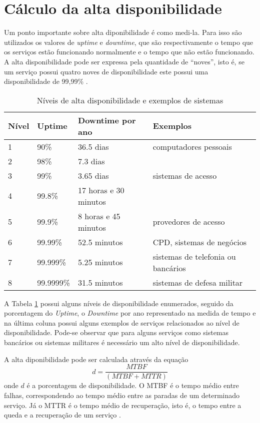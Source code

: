 \section{Cálculo da alta disponibilidade}

Um ponto importante sobre alta diponibilidade é como medi-la. Para isso são utilizados os valores de \textit{uptime} e 
\textit{downtime}, que são respectivamente o tempo que os serviços estão funcionando normalmente e o tempo que não estão funcionando.
A alta disponibilidade pode ser expressa pela quantidade de ``noves'', isto é, se um serviço possui quatro noves de disponibilidade
este possui uma disponibilidade de 99,99\% \cite{pereirafilho2004}.

\begin{table}
\caption {Níveis de alta disponibilidade e exemplos de sistemas}
\label{tab:dispniveis}
\begin{center}
\begin{tabular}{|l|l|l|l|}\hline
Nível & Uptime & Downtime por ano & Exemplos\\\hline
1 & 90\% & 36.5 dias & computadores pessoais\\\hline
2 & 98\% & 7.3 dias & \\\hline
3 & 99\% & 3.65 dias & sistemas de acesso\\\hline
4 & 99.8\% & 17 horas e 30 minutos & \\\hline
5 & 99.9\% & 8 horas e 45 minutos & provedores de acesso\\\hline
6 & 99.99\% & 52.5 minutos & CPD, sistemas de negócios\\\hline
7 & 99.999\% & 5.25 minutos & sistemas de telefonia ou bancários\\\hline
8 & 99.9999\% & 31.5 minutos & sistemas de defesa militar\\\hline
\end{tabular}
\end{center}
\end{table}

A Tabela \ref{tab:dispniveis} possui alguns níveis de disponibilidade enumerados, seguido da porcentagem do \textit{Uptime}, 
o \textit{Downtime} por ano representado na medida de tempo e na última coluna possui alguns exemplos de serviços relacionados ao 
nível de disponibilidade. Pode-se observar que para alguns serviços como sistemas bancários ou sistemas militares é necessário um 
alto nível de disponibilidade.

A alta diponibilidade pode ser calculada através da equação
\begin{equation}
d = \frac{MTBF}{(MTBF + MTTR)}
\label{diponibilidade}
\end{equation}
onde $d$ é a porcentagem de disponibilidade. O \ac{MTBF} é o tempo médio entre falhas, correspondendo ao 
tempo médio entre as paradas de um determinado serviço. Já o \ac{MTTR} é o tempo médio de recuperação, isto é, 
o tempo entre a queda e a recuperação de um serviço \cite{goncalves2009}.

